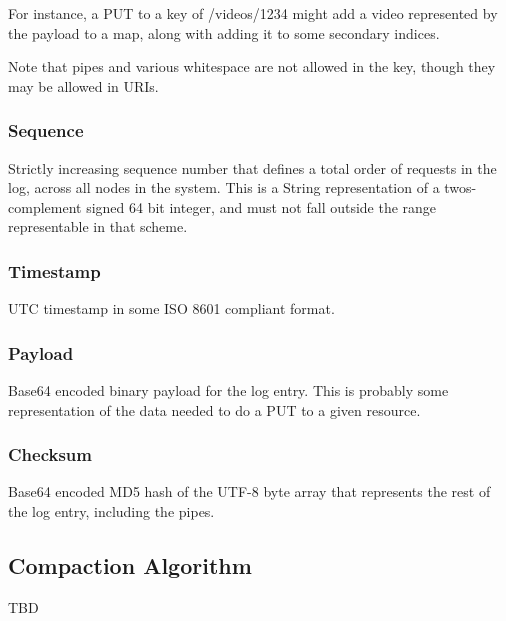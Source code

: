 For instance, a PUT to a key of /videos/1234 might add a video represented by the payload to a map, along with adding it to some secondary indices.  

Note that pipes and various whitespace are not allowed in the key, though they may be allowed in URIs.

\subsubsection{Sequence}
Strictly increasing sequence number that defines a total order of requests in the log, across all nodes in the system.  This is a String representation of a twos-complement signed  64 bit integer, and must not fall outside the range representable in that scheme.

\subsubsection{Timestamp}
UTC timestamp in some ISO 8601 compliant format.

\subsubsection{Payload}
Base64 encoded binary payload for the log entry.  This is probably some representation of the data needed to do a PUT to a given resource.

\subsubsection{Checksum}
Base64 encoded MD5 hash of the UTF-8 byte array that represents the rest of the log entry, including the pipes.


\subsection{Compaction Algorithm}
TBD



